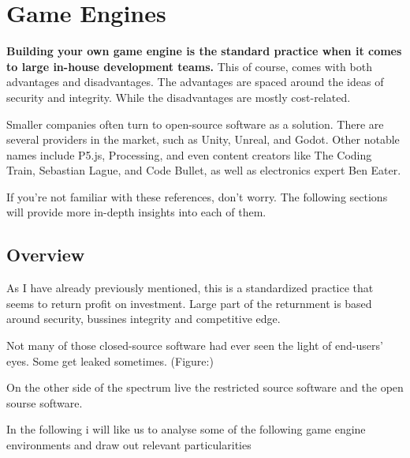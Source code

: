 
\chapter*{Game Engines}
  \textbf{Building your own game engine is the standard practice when it comes to large in-house development teams.}
  This of course, comes with both advantages and disadvantages.
  The advantages are spaced around the ideas of security and integrity.
  While the disadvantages are mostly cost-related.

  Smaller companies often turn to open-source software as a solution. There are several providers in the market, such as Unity, Unreal, and Godot. Other notable names include P5.js, Processing, and even content creators like The Coding Train, Sebastian Lague, and Code Bullet, as well as electronics expert Ben Eater.

  If you're not familiar with these references, don't worry. The following sections will provide more in-depth insights into each of them.

  \section*{Overview}

  As I have already previously mentioned, this is a standardized practice that seems to return profit on investment.
  Large part of the returnment is based around security, bussines integrity and competitive edge.
  
  Not many of those closed-source software had ever seen the light of end-users' eyes. Some get leaked sometimes. (Figure:)


  On the other side of the spectrum live the restricted source software and the open sourse software.

  In the following i will like us to analyse some of the following game engine environments and draw out relevant particularities






